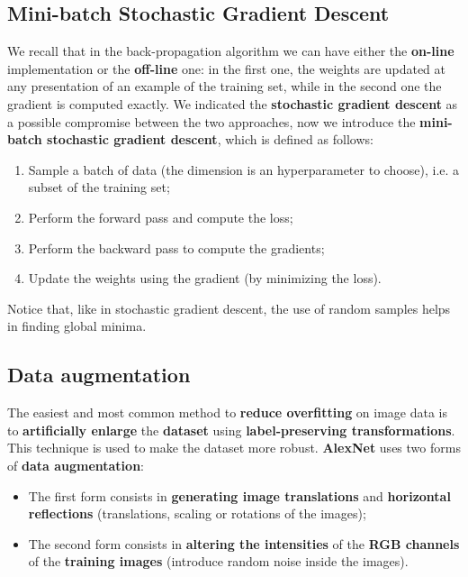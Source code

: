 \subsection{Mini-batch Stochastic Gradient Descent} 
We recall that in the back-propagation algorithm we can have either the \textbf{on-line} implementation or the \textbf{off-line} one: in the first one, the weights are updated at any presentation of an example of the training set, while in the second one the gradient is computed exactly. We indicated the \textbf{stochastic gradient descent} as a possible compromise between the two approaches, now we introduce the \textbf{mini-batch stochastic gradient descent}, which is defined as follows:

\begin{enumerate}
	\item Sample a batch of data (the dimension is an hyperparameter to choose), i.e. a subset of the training set;
	\item Perform the forward pass and compute the loss;
	\item Perform the backward pass to compute the gradients;
	\item Update the weights using the gradient (by minimizing the loss).
\end{enumerate} 

Notice that, like in stochastic gradient descent, the use of random samples helps in finding global minima.

\subsection{Data augmentation}
The easiest and most common method to \textbf{reduce overfitting} on image data is to \textbf{artificially enlarge} the \textbf{dataset} using \textbf{label-preserving transformations}. This technique is used to make the dataset more robust. \textbf{AlexNet} uses two forms of \textbf{data augmentation}:
\begin{itemize}
	\item The first form consists in \textbf{generating image translations} and \textbf{horizontal reflections} (translations, scaling or rotations of the images);
	\item The second form consists in \textbf{altering the intensities} of the \textbf{RGB channels} of the \textbf{training images} (introduce random noise inside the images). 
\end{itemize}


